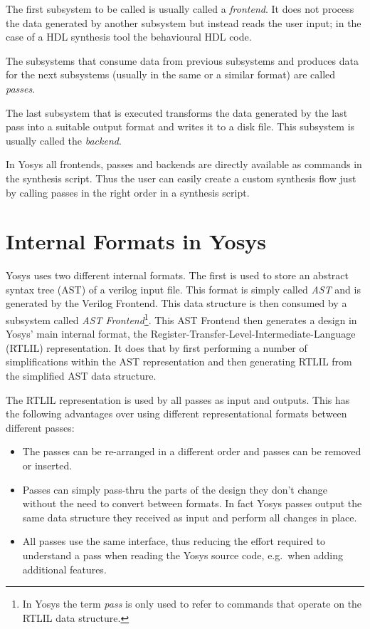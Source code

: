 The first subsystem to be called is usually called a {\it frontend}. It does not process the data generated by
another subsystem but instead reads the user input; in the case of a HDL synthesis tool the behavioural
HDL code.

The subsystems that consume data from previous subsystems and produces data for the next subsystems (usually in the
same or a similar format) are called {\it passes}.

The last subsystem that is executed transforms the data generated by the last pass into a suitable output
format and writes it to a disk file. This subsystem is usually called the {\it backend}.

In Yosys all frontends, passes and backends are directly available as commands in the synthesis script. Thus
the user can easily create a custom synthesis flow just by calling passes in the right order in a synthesis
script.

\section{Internal Formats in Yosys}

Yosys uses two different internal formats. The first is used to store an abstract syntax tree (AST) of a verilog
input file. This format is simply called {\it AST} and is generated by the Verilog Frontend. This data structure
is then consumed by a subsystem called {\it AST Frontend}\footnote{In Yosys the term {\it pass} is only used to
refer to commands that operate on the RTLIL data structure.}. This AST Frontend then generates a design in Yosys'
main internal format, the Register-Transfer-Level-Intermediate-Language (RTLIL) representation. It does that
by first performing a number of simplifications within the AST representation and then generating RTLIL from
the simplified AST data structure.

The RTLIL representation is used by all passes as input and outputs. This has the following advantages over
using different representational formats between different passes:

\begin{itemize}
\item The passes can be re-arranged in a different order and passes can be removed or inserted.
\item Passes can simply pass-thru the parts of the design they don't change without the need
      to convert between formats. In fact Yosys passes output the same data structure they received
      as input and perform all changes in place.
\item All passes use the same interface, thus reducing the effort required to understand a pass
      when reading the Yosys source code, e.g.~when adding additional features.
\end{itemize}

